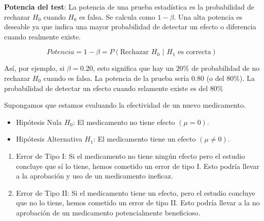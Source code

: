 \documentclass[
  letterpaper,
  DIV=11,
  numbers=noendperiod]{scrreprt}
\providecommand{\tightlist}{%
  \setlength{\itemsep}{0pt}\setlength{\parskip}{0pt}}\usepackage{longtable,booktabs,array}
\begin{document}
\textbf{Potencia del test}: La potencia de una prueba estadística es la
probabilidad de rechazar \(H_0\) cuando \(H_0\) es falsa. Se calcula
como \(1 - \beta\). Una alta potencia es deseable ya que indica una
mayor probabilidad de detectar un efecto o diferencia cuando realmente
existe.

\[
Potencia=1-\beta=P(\text{Rechazar } H_0 \text{ | } H_1 \text{ es correcta})
\]

Así, por ejemplo, si \(\beta = 0.20\), esto significa que hay un
\(20\%\) de probabilidad de no rechazar \(H_0\) cuando es falsa. La
potencia de la prueba sería \(0.80\) (o del \(80\%\)). La probabilidad
de detectar un efecto cuando relamente existe es del \(80\%\)

\begin{tcolorbox}[enhanced jigsaw, arc=.35mm, breakable, coltitle=black, left=2mm, opacityback=0, bottomtitle=1mm, colbacktitle=quarto-callout-tip-color!10!white, title=\textcolor{quarto-callout-tip-color}{\faLightbulb}\hspace{0.5em}{Ejemplo Práctico. Errores Tipo I y II}, titlerule=0mm, colback=white, colframe=quarto-callout-tip-color-frame, bottomrule=.15mm, rightrule=.15mm, opacitybacktitle=0.6, toptitle=1mm, toprule=.15mm, leftrule=.75mm]

Supongamos que estamos evaluando la efectividad de un nuevo medicamento.

\begin{itemize}
\tightlist
\item
  Hipótesis Nula \(H_0\): El medicamento no tiene efecto \((\mu = 0)\).
\item
  Hipótesis Alternativa \(H_1\): El medicamento tiene un efecto
  \((\mu \neq 0)\).
\end{itemize}

\begin{enumerate}
\def\labelenumi{\arabic{enumi}.}
\item
  Error de Tipo I: Si el medicamento no tiene ningún efecto pero el
  estudio concluye que sí lo tiene, hemos cometido un error de tipo I.
  Esto podría llevar a la aprobación y uso de un medicamento ineficaz.
\item
  Error de Tipo II: Si el medicamento tiene un efecto, pero el estudio
  concluye que no lo tiene, hemos cometido un error de tipo II. Esto
  podría llevar a la no aprobación de un medicamento potencialmente
  beneficioso.
\end{enumerate}

\end{tcolorbox}
\end{document}
